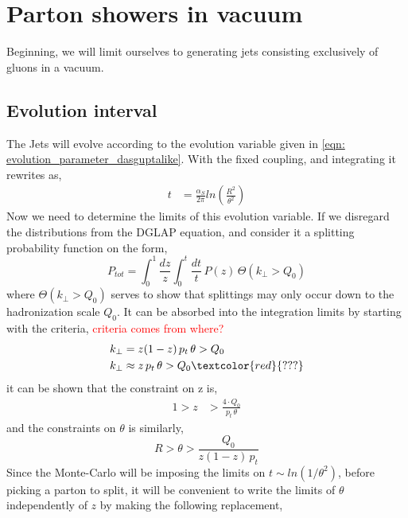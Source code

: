 \documentclass[main.tex]{subfiles}
\begin{document}
\section{Parton showers in vacuum}
Beginning, we will limit ourselves to generating jets consisting exclusively of gluons in a vacuum.

\subsection{Evolution interval }\label{sec: determining_evolution_time_from_sudakov}
The Jets will evolve according to the evolution variable given in \autoref{eqn: evolution_parameter_dasguptalike}. With the fixed coupling, and integrating it rewrites as, 
\begin{align}\label{eqn: evolution_parameter_integrated}
    t &= \frac{\alpha_S}{2\pi} ln(\frac{R^2}{\theta^2})
\end{align}
Now we need to determine the limits of this evolution variable. If we disregard the distributions from the DGLAP equation, and consider it a splitting probability function on the form,
\begin{equation}\label{eqn: dglap_ellis_style_probability_thetafunc}
    P_{tot} = \int_0^1 \frac{dz}{z} \int_0^{t} \frac{dt}{t} \, P(z) \, \Theta(k_\perp >Q_0)
\end{equation}
where \(\Theta(k_\perp >Q_0)\) serves to show that splittings may only occur down to the hadronization scale \(Q_0\). It can be absorbed into the integration limits by starting with the criteria, \textcolor{red}{ criteria comes from where? }
\begin{align}
    \begin{split}
        k_\perp &= z(1-z)\, p_t\, \theta > Q_0  \\
        k_\perp &\approx z\, p_t\, \theta > Q_0 \textcolor{red}{???}
    \end{split}
\end{align}
it can be shown that the constraint on z is,
\begin{align}
    1 > z &> \frac{4\cdot Q_0}{p_t\, \theta}
\end{align}
and the constraints on \(\theta\) is similarly,
\begin{equation}
     R>\theta >\frac{Q_0}{z(1-z)\, p_t} %
\end{equation}
Since the Monte-Carlo will be imposing the limits on \(t \sim ln(1/\theta^2) \), before picking a parton to split, it will be convenient to write the limits of \(\theta\) independently of \(z\) by making the following replacement,
\end{document}
